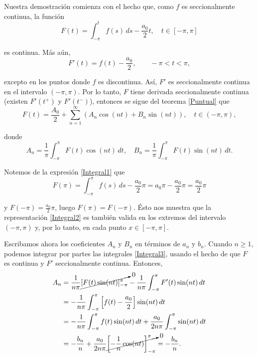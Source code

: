 \begin{demo}
Nuestra demostración comienza con el hecho que, como $f$ es seccionalmente continua, la función
\begin{equation}
  F(t) = \int_{-\pi}^t f(s) \,ds - \frac{a_0}{2} t, \quad t \in [-\pi,\pi] \label{Integral1}
\end{equation}

es continua. Más aún, 
$$F'(t) = f(t) - \frac{a_0}{2}, \qquad - \pi < t <\pi, $$

excepto en los puntos donde $f$ es discontinua. Así, $F'$ es seccionalmente continua en el intervalo $(-\pi,\pi)$. Por lo tanto, $F$ tiene derivada seccionalmente continua (existen $F'(t^+)$ y $F'(t^-)$), entonces se sigue del teorema \eqref{Puntual} que
\begin{equation}
    F(t) = \frac{A_0}{2} + \sum_{n=1}^{\infty} (A_n \cos(nt) + B_n \sin(nt)), \quad t \in (-\pi,\pi), \label{Integral2}
\end{equation}

donde 
\begin{equation}
    A_n =  \frac{1}{\pi} \int_{-\pi}^{\pi} F(t) \cos(nt) \,dt, \quad B_n = \frac{1}{\pi} \int_{-\pi}^{\pi} F(t) \sin(nt) \,dt.\label{Integral3}
\end{equation}

Notemos de la expresión \eqref{Integral1} que 
$$F(\pi) = \int_{-\pi}^{\pi} f(s) \,ds - \frac{a_0}{2} \pi = a_0 \pi - \frac{a_0}{2}\pi = \frac{a_0}{2}\pi$$

y $F(-\pi) = \frac{a_0}{2}\pi$, luego $F(\pi) = F(- \pi)$. Ésto nos muestra que la representación \eqref{Integral2} es también valida en los extremos del intervalo $(-\pi,\pi)$ y, por lo tanto, en cada punto $x \in [-\pi,\pi]$.

Escribamos ahora los coeficientes $A_n$ y $B_n$ en términos de $a_n$ y $b_n$. Cuando $n \geq 1$, podemos integrar por partes las integrales \eqref{Integral3}, usando el hecho de que $F$ es continua y $F'$ seccionalmente continua. Entonces,
\begin{align*}
    A_n &= \frac{1}{n\pi} \cancelto{0}{[F(t) \sin(nt)]_{-\pi}^{\pi}} - \frac{1}{n\pi} \int_{-\pi}^{\pi} F'(t) \sin(nt) \,dt \\
    &=  - \frac{1}{n\pi} \int_{-\pi}^{\pi} \left[ f(t) - \frac{a_0}{2} \right] \sin(nt) \,dt \\
    &= - \frac{1}{n\pi} \int_{-\pi}^{\pi} f(t) \sin(nt) \,dt + \frac{a_0}{2n\pi} \int_{-\pi}^{\pi} \sin(nt) \,dt \\
    &= - \frac{b_n}{n} + \frac{a_0}{2n\pi} \cancelto{0}{\left[ -\frac{1}{n} \cos(nt)\right]_{-\pi}^{\pi} } = - \frac{b_n}{n}.
\end{align*}


\end{demo}
